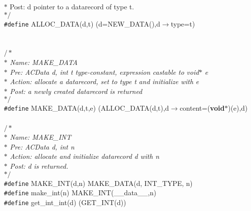 \begin{flushleft}
{\hspace*{1\indentation}$\ast$ Post: d pointer to a datarecord of type t.\mbox{}\\
\hspace*{1\indentation}$\ast/$}\mbox{}\\
{\tt \#define} ALLOC\_DATA(d,t) (d=NEW\_DATA(),d$\rightarrow$type=t)\mbox{}\\
\mbox{}\\
\mbox{}\\
{$/\ast$\it{}\mbox{}\\
\hspace*{1\indentation}$\ast$ Name: MAKE\_DATA\mbox{}\\
\hspace*{1\indentation}$\ast$ Pre: ACData d, int t type-constant, expression castable to void$\ast$ e\mbox{}\\
\hspace*{1\indentation}$\ast$ Action: allocate a datarecord, set to type t and initialize with e\mbox{}\\
\hspace*{1\indentation}$\ast$ Post: a newly created datarecord is returned\mbox{}\\
\hspace*{1\indentation}$\ast/$}\mbox{}\\
{\tt \#define} MAKE\_DATA(d,t,e) (ALLOC\_DATA(d,t),d$\rightarrow$content=({\bf void}$\ast$)(e),d)\mbox{}\\
\mbox{}\\
{$/\ast$\it{}\mbox{}\\
\hspace*{1\indentation}$\ast$ Name: MAKE\_INT\mbox{}\\
\hspace*{1\indentation}$\ast$ Pre: ACData d, int n\mbox{}\\
\hspace*{1\indentation}$\ast$ Action: allocate and initialize datarecord d with n\mbox{}\\
\hspace*{1\indentation}$\ast$ Post: d is returned.\mbox{}\\
\hspace*{1\indentation}$\ast/$}\mbox{}\\
{\tt \#define} MAKE\_INT(d,n) MAKE\_DATA(d, INT\_TYPE, n)\mbox{}\\
{\tt \#define} make\_int(n) MAKE\_INT(\_\_data\_\_,n)\mbox{}\\
{\tt \#define} get\_int\_int(d) (GET\_INT(d))\mbox{}\\

\end{flushleft}
